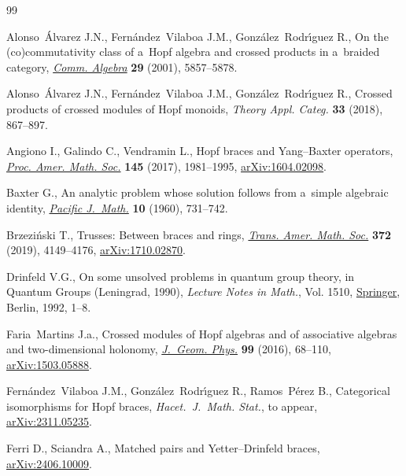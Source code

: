 \documentclass[10pt,a4paper]{amsart}
\numberwithin{equation}{section}
\begin{document}
\begin{thebibliography}{99}
\footnotesize\itemsep=0pt

Alonso~\'Alvarez J.N., Fern\'andez~Vilaboa J.M., Gonz\'alez~Rodr\'{\i}guez R.,
 On the (co)commutativity class of a~{H}opf algebra and crossed products in
 a~braided category, \href{https://doi.org/10.1081/AGB-100107962}{\textit{Comm. Algebra}} \textbf{29} (2001), 5857--5878.

Alonso~\'Alvarez J.N., Fern\'andez~Vilaboa J.M., Gonz\'alez~Rodr\'{\i}guez R.,
 Crossed products of crossed modules of {H}opf monoids, \textit{Theory Appl.
 Categ.} \textbf{33} (2018), 867--897.

Angiono I., Galindo C., Vendramin L., Hopf braces and {Y}ang--{B}axter
 operators, \href{https://doi.org/10.1090/proc/13395}{\textit{Proc. Amer. Math. Soc.}} \textbf{145} (2017), 1981--1995,
 \href{https://arxiv.org/abs/1604.02098}{arXiv:1604.02098}.

Baxter G., An analytic problem whose solution follows from a~simple algebraic
 identity, \href{https://doi.org/10.2140/pjm.1960.10.731}{\textit{Pacific J.~Math.}} \textbf{10} (1960), 731--742.

Brzezi\'nski T., Trusses: {B}etween braces and rings, \href{https://doi.org/10.1090/tran/7705}{\textit{Trans. Amer.
 Math. Soc.}} \textbf{372} (2019), 4149--4176, \href{https://arxiv.org/abs/1710.02870}{arXiv:1710.02870}.

Drinfeld V.G., On some unsolved problems in quantum group theory, in Quantum
 Groups ({L}eningrad, 1990), \textit{Lecture Notes in Math.}, Vol. 1510,
 \href{https://doi.org/10.1007/BFb0101175}{Springer}, Berlin, 1992, 1--8.

Faria~Martins J.a., Crossed modules of {H}opf algebras and of associative
 algebras and two-dimensional holonomy, \href{https://doi.org/10.1016/j.geomphys.2015.09.012}{\textit{J.~Geom. Phys.}} \textbf{99}
 (2016), 68--110, \href{https://arxiv.org/abs/1503.05888}{arXiv:1503.05888}.

Fern\'andez~Vilaboa J.M., Gonz\'alez~Rodr\'{\i}guez R., Ramos~P\'erez B.,
 Categorical isomorphisms for Hopf braces, \textit{Hacet.~J.~Math. Stat.}, {t}o
 appear, \href{https://arxiv.org/abs/2311.05235}{arXiv:2311.05235}.

Ferri D., Sciandra A., Matched pairs and {Y}etter--{D}rinfeld braces,
 \href{https://arxiv.org/abs/2406.10009}{arXiv:2406.10009}.


\end{thebibliography}
\end{document}

